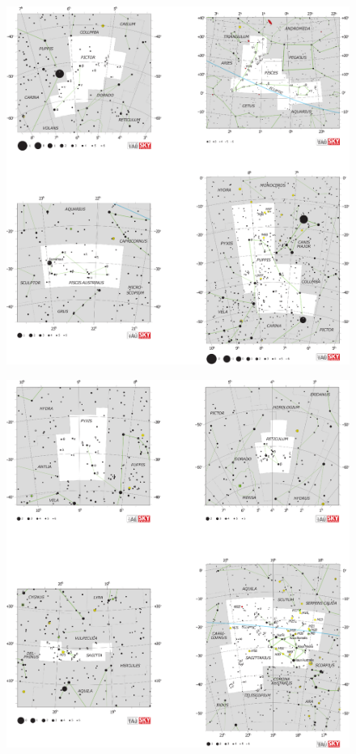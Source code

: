 \documentclass[a4paper,12pt]{extarticle}
\begin{document}
\clearpage
\begin{figure}
	\centering
	\includegraphics[width=\linewidth]{C17.eps}
\end{figure}
\clearpage
\begin{figure}
	\centering
	\includegraphics[width=\linewidth]{C18.eps}
\end{figure}
\end{document}
